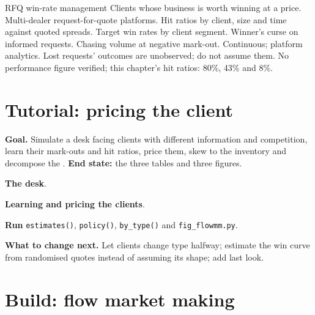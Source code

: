 \begin{strategyfile}{RFQ win-rate management}\label{strat:s2:flow-market-making-at-a-bank:winrate}
 Clients whose business is worth winning at a price.
 Multi-dealer request-for-quote platforms.
 Hit ratios by client, size and time against quoted spreads.
 Target win rates by client segment.
 Winner's curse on informed requests.
 Chasing volume at negative mark-out.
 Continuous; platform analytics.
 Lost requests' outcomes are unobserved; do not assume them.
 No performance figure verified; this chapter's hit ratios: 80\%, 43\% and 8\%.
\end{strategyfile}

\section{Tutorial: pricing the client}\label{tut:s2:flow-market-making-at-a-bank:tut}

\begin{tutorial}
\textbf{Goal.} Simulate a desk facing clients with different information and competition, learn their mark-outs and hit ratios, price them, skew to
the inventory and decompose the . \textbf{End state:} the three tables and three figures.
\begin{tutsteps}
\item \textbf{The desk}.
\label{lst:s2:flow-market-making-at-a-bank:desk}
\item \textbf{Learning and pricing the clients}.
\label{lst:s2:flow-market-making-at-a-bank:price}
\item \textbf{Run} \texttt{estimates()}, \texttt{policy()}, \texttt{by\_type()} and \texttt{fig\_flowmm.py}.
\end{tutsteps}
\textbf{What to change next.} Let clients change type halfway; estimate the win curve from randomised quotes instead of assuming its shape; add last
look.
\end{tutorial}

\section{Build: flow market making}\label{bld:s2:flow-market-making-at-a-bank:flowmm}

